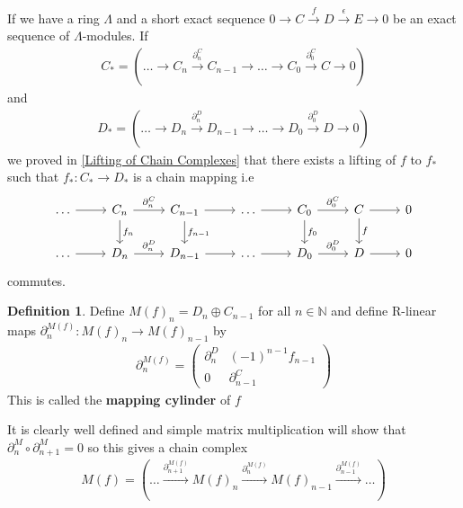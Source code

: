 \documentclass[12pt]{book}
\theoremstyle{definition}
\newtheorem{definition}[theorem]{Definition}
\begin{document}
\noindent If we have a ring $\Lambda$ and a short exact sequence $0 \rightarrow C \xrightarrow{f} D \xrightarrow{\epsilon} E \rightarrow 0$ be an exact sequence of $\Lambda$-modules. If 
\begin{align*}
    C_* = ( \dots \rightarrow C_n \xrightarrow{\partial^C_n} C_{n-1} \rightarrow \dots \rightarrow C_0 \xrightarrow{\partial^C_0} C \rightarrow 0)
\end{align*}
and 
\begin{align*}
    D_* = ( \dots \rightarrow D_n \xrightarrow{\partial^D_n} D_{n-1} \rightarrow \dots \rightarrow D_0 \xrightarrow{\partial^D_0} D \rightarrow 0)
\end{align*}
we proved in \ref{Lifting of Chain Complexes} that there exists a lifting of $f$ to $f_*$ such that $f_*: C_* \to D_*$ is a chain mapping i.e
\[
\begin{tikzcd}
    \dots \arrow[r] & C_n \arrow[r, "\partial^C_n"] \arrow[d, "f_n"]
    & C_{n-1} \arrow[r] \arrow[d, "f_{n-1}"] 
    & \dots \arrow[r]
    & C_0 \arrow[r, "\partial^C_0"] \arrow[d, "f_0"]
    & C \arrow[r] \arrow[d, "f"]
    & 0\\
    \dots \arrow[r] & D_n \arrow[r, "\partial^D_n"] 
    & D_{n-1} \arrow[r] 
    & \dots \arrow[r]
    & D_0 \arrow[r, "\partial^D_0"] 
    & D \arrow[r]
    & 0
\end{tikzcd} 
\]
commutes.\\

\begin{definition}
    Define $M(f)_n = D_n \oplus C_{n-1}$ for all $n \in \mathbb{N}$ and define R-linear maps $\partial^{M(f)}_n: M(f)_n \to M(f)_{n-1}$ by 
    \begin{align*}
        \partial^{M(f)}_n = 
        \begin{pmatrix}
            \partial^D_{n} & (-1)^{n-1}f_{n-1} \\
            0                & \partial^C_{n-1}
        \end{pmatrix}
    \end{align*}
    This is called the \textbf{mapping cylinder} of $f$ 
\end{definition}

It is clearly well defined and simple matrix multiplication will show that $\partial^M_n \circ \partial^M_{n+1} = 0$ so this gives a chain complex
\begin{align*}
    M(f) = (\dots \xrightarrow{\partial^{M(f)}_{n+1}} M(f)_n \xrightarrow{\partial^{M(f)}_{n}} M(f)_{n-1} \xrightarrow{\partial^{M(f)}_{n-1}} \dots)
\end{align*}
\end{document}
